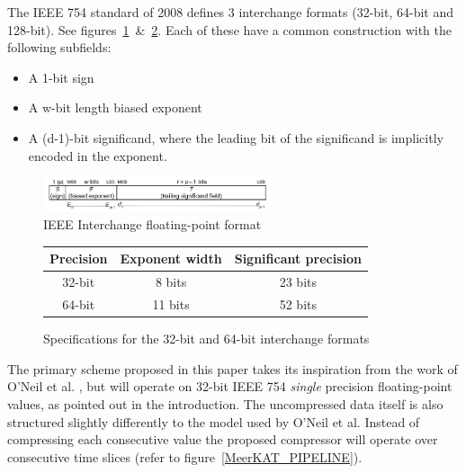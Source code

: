 The IEEE 754 standard of 2008 defines 3 interchange formats (32-bit, 64-bit and 128-bit). See figures~\ref{IEEE_FLOAT}~\&~\ref{IEEE_FLOAT_TAB}. Each of these have a common 
construction with the following subfields:
\begin{itemize}
 \item A 1-bit sign
 \item A w-bit length biased exponent
 \item A (d-1)-bit significand, where the leading bit of the significand is implicitly encoded in the exponent.
\end{itemize}
\begin{figure}[h!]
  \begin{mdframed}
  \centering
  \includegraphics[width=0.6\textwidth]{IEEEinterchangeFormat.png}
  \caption{IEEE Interchange floating-point format \cite{4610935}}
  \label{IEEE_FLOAT}
  \end{mdframed}
\end{figure}
\begin{figure}[h!]
\begin{mdframed}
\centering
\begin{tabular}{|c|c|c|}
 \hline
 Precision & Exponent width & Significant precision \\
 \hline
 32-bit & 8 bits & 23 bits \\
 \hline
 64-bit & 11 bits & 52 bits \\
 \hline
\end{tabular}
\caption{Specifications for the 32-bit and 64-bit interchange formats}
 \label{IEEE_FLOAT_TAB}
\end{mdframed}
\end{figure}
The primary scheme proposed in this paper takes its inspiration from the work of O'Neil et al. \cite{O'Neil:2011:FDC:1964179.1964189}, but will operate on 32-bit 
IEEE 754 \textit{single} precision floating-point values, as pointed out in the introduction. The uncompressed data itself is also structured slightly 
differently to the model used by O'Neil et al. Instead of compressing each consecutive value the proposed compressor will operate 
over consecutive time slices (refer to figure~\ref{MeerKAT_PIPELINE}).

